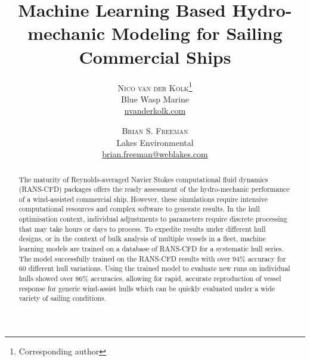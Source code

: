\documentclass[twoside,twocolumn]{article}
\begin{document}

\setlength{\droptitle}{-4\baselineskip} %

\title{Machine Learning Based Hydro-mechanic Modeling for Sailing Commercial Ships} %
\author{%
	\textsc{Nico van der Kolk}\thanks{Corresponding author} \\[1ex] %
	\normalsize Blue Wasp Marine \\ %
	\normalsize \href{mailto:nvanderkolk@bluewaspmarine.com}{nvanderkolk\@bluewaspmarine.com} %
	\and %
	\textsc{Brian S. Freeman} \\[1ex] %
	\normalsize Lakes Environmental \\ %
	\normalsize \href{brian.freeman@weblakes.com}{brian.freeman@weblakes.com } %
}
\date{} %
\begin{abstract}
	\noindent 
	The maturity of Reynolds-averaged Navier Stokes computational fluid dynamics (RANS-CFD) packages offers the ready assessment of the hydro-mechanic performance of a wind-assisted commercial ship. However, these simulations require intensive computational resources and complex software to generate results. In the hull optimisation context, individual adjustments to parameters require discrete processing that may take hours or days to process. To expedite results under different hull designs, or in the context of bulk analysis of multiple vessels in a fleet,  machine learning models are trained on a database of RANS-CFD for a systematic hull series. The model successfully trained on the RANS-CFD results with over 94\% accuracy for 60 different hull variations. Using the trained model to evaluate new runs on individual hulls showed over 86\% accuracies, allowing for rapid, accurate reproduction of vessel response for generic wind-assist hulls which can be quickly evaluated under a wide variety of sailing conditions. 
\end{abstract}
\end{document}
